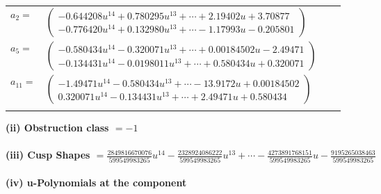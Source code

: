 \documentclass[1p]{elsarticle_modified}
\theoremstyle{definition}
\begin{document}
\begin{tabular}{m{7pt} m{180pt} m{7pt} m{180pt} }
\flushright $a_{2}=$&$\begin{pmatrix}-0.644208 u^{14}+0.780295 u^{13}+\cdots+2.19402 u+3.70877\\-0.776420 u^{14}+0.132980 u^{13}+\cdots-1.17993 u-0.205801\end{pmatrix}$ \\
\flushright $a_{5}=$&$\begin{pmatrix}-0.580434 u^{14}-0.320071 u^{13}+\cdots+0.00184502 u-2.49471\\-0.134431 u^{14}-0.0198011 u^{13}+\cdots+0.580434 u+0.320071\end{pmatrix}$ \\
\flushright $a_{11}=$&$\begin{pmatrix}-1.49471 u^{14}-0.580434 u^{13}+\cdots-13.9172 u+0.00184502\\0.320071 u^{14}-0.134431 u^{13}+\cdots+2.49471 u+0.580434\end{pmatrix}$\\&\end{tabular}
\flushleft \textbf{(ii) Obstruction class $= -1$}\\~\\
\flushleft \textbf{(iii) Cusp Shapes $= \frac{2849816670076}{599549983265} u^{14}-\frac{2328924086222}{599549983265} u^{13}+\cdots-\frac{4273891768151}{599549983265} u-\frac{9195265038463}{599549983265}$}\\~\\
\newpage\renewcommand{\arraystretch}{1}
\flushleft \textbf{(iv) u-Polynomials at the component}\newline \\
\end{document}
